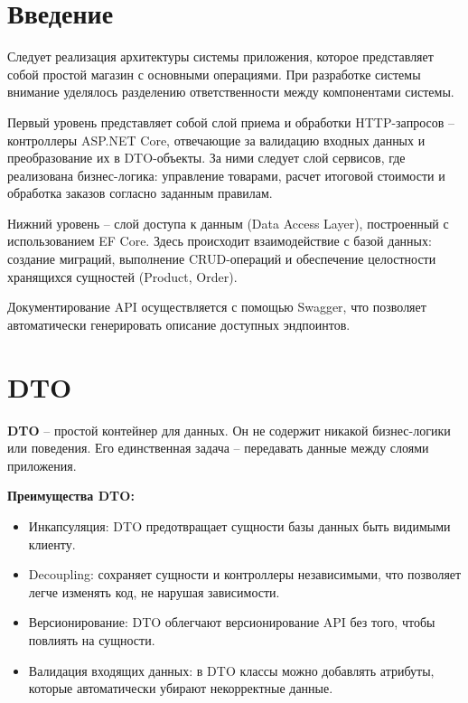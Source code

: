 \documentclass[a4paper,12pt]{report}
\begin{document}
\section{Введение}

Следует реализация архитектуры системы приложения, которое представляет собой простой магазин с основными операциями. 
При разработке системы внимание уделялось разделению ответственности между компонентами системы.

Первый уровень представляет собой слой приема и обработки \acs{HTTP}-запросов -- контроллеры ASP.NET Core, 
отвечающие за валидацию входных данных и преобразование их в \acs{DTO}-объекты. 
За ними следует слой сервисов, где реализована бизнес-логика: управление товарами, расчет итоговой стоимости 
и обработка заказов согласно заданным правилам.

Нижний уровень -- слой доступа к данным (Data Access Layer), построенный с использованием \acs{EF} Core. 
Здесь происходит взаимодействие с базой данных: создание миграций, выполнение \acs{CRUD}-операций и 
обеспечение целостности хранящихся сущностей (Product, Order).

Документирование \acs{API} осуществляется с помощью Swagger, что позволяет автоматически генерировать описание доступных эндпоинтов.

\section{\acs{DTO}}

\textbf{\acs{DTO}} -- простой контейнер для данных. Он не содержит никакой бизнес-логики или поведения.
Его единственная задача -- передавать данные между слоями приложения.

\textbf{Преимущества \acs{DTO}:}
\begin{itemize}
    \item
        Инкапсуляция: \acs{DTO} предотвращает сущности базы данных быть видимыми клиенту.
    \item
        Decoupling: сохраняет сущности и контроллеры независимыми, что позволяет легче изменять
        код, не нарушая зависимости.
    \item
        Версионирование: \acs{DTO} облегчают версионирование \acs{API} без того, чтобы повлиять на сущности.
    \item
        Валидация входящих данных: в \acs{DTO} классы можно добавлять атрибуты, которые автоматически убирают 
        некорректные данные.\cite{dto}
\end{itemize}
\end{document}
